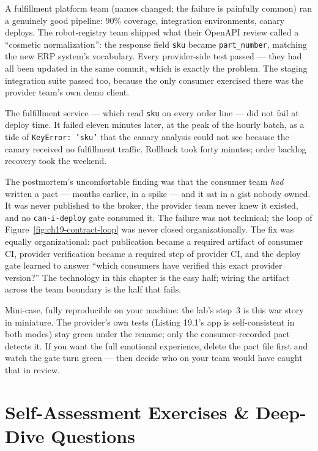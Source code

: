 A fulfillment platform team (names changed; the failure is painfully
common) ran a genuinely good pipeline: 90\% coverage, integration
environments, canary deploys. The robot-registry team shipped what their
OpenAPI review called a ``cosmetic normalization'': the response field
\texttt{sku} became \texttt{part\_number}, matching the new ERP system's
vocabulary. Every provider-side test passed --- they had all been updated
in the same commit, which is exactly the problem. The staging integration
suite passed too, because the only consumer exercised there was the
provider team's own demo client.

The fulfillment service --- which read \texttt{sku} on every order line ---
did not fail at deploy time. It failed eleven minutes later, at the peak of
the hourly batch, as a tide of \texttt{KeyError: 'sku'} that the canary
analysis could not see because the canary received no fulfillment traffic.
Rollback took forty minutes; order backlog recovery took the weekend.

The postmortem's uncomfortable finding was that the consumer team
\emph{had} written a pact --- months earlier, in a spike --- and it sat in
a gist nobody owned. It was never published to the broker, the provider
team never knew it existed, and no \texttt{can-i-deploy} gate consumed it.
The failure was not technical; the loop of
Figure~\ref{fig:ch19-contract-loop} was never closed organizationally. The
fix was equally organizational: pact publication became a required artifact
of consumer CI, provider verification became a required step of provider
CI, and the deploy gate learned to answer ``which consumers have verified
this exact provider version?'' The technology in this chapter is the easy
half; wiring the artifact across the team boundary is the half that fails.

\begin{examplebox}
Mini-case, fully reproducible on your machine: the lab's step~3 is this
war story in miniature. The provider's own tests (Listing 19.1's app is
self-consistent in both modes) stay green under the rename; only the
consumer-recorded pact detects it. If you want the full emotional
experience, delete the pact file first and watch the gate turn green ---
then decide who on your team would have caught that in review.
\end{examplebox}

\section{Self-Assessment Exercises \& Deep-Dive Questions}
\label{sec:ch19-exercises}

